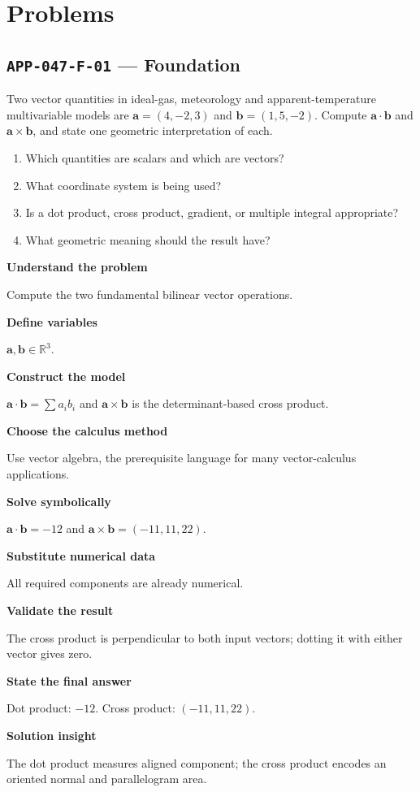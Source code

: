 \documentclass[11pt]{book}
\newcommand{\pid}[1]{\texttt{#1}}
\begin{document}
\section*{Problems}
\subsection*{\pid{APP-047-F-01} — Foundation}
\begin{problembox}
Two vector quantities in ideal-gas, meteorology and apparent-temperature multivariable models are $\mathbf a=(4,-2,3)$ and $\mathbf b=(1,5,-2)$. Compute $\mathbf a\cdot\mathbf b$ and $\mathbf a\times\mathbf b$, and state one geometric interpretation of each.
\end{problembox}
\begin{promptbox}\begin{enumerate}
\item Which quantities are scalars and which are vectors?
\item What coordinate system is being used?
\item Is a dot product, cross product, gradient, or multiple integral appropriate?
\item What geometric meaning should the result have?
\end{enumerate}\end{promptbox}
\begin{solutionbox}
\textbf{Understand the problem}\par Compute the two fundamental bilinear vector operations.\par\medskip
\textbf{Define variables}\par $\mathbf a,\mathbf b\in\mathbb R^3$.\par\medskip
\textbf{Construct the model}\par $\mathbf a\cdot\mathbf b=\sum a_ib_i$ and $\mathbf a\times\mathbf b$ is the determinant-based cross product.\par\medskip
\textbf{Choose the calculus method}\par Use vector algebra, the prerequisite language for many vector-calculus applications.\par\medskip
\textbf{Solve symbolically}\par $\mathbf a\cdot\mathbf b=-12$ and $\mathbf a\times\mathbf b=(-11,11,22)$.\par\medskip
\textbf{Substitute numerical data}\par All required components are already numerical.\par\medskip
\textbf{Validate the result}\par The cross product is perpendicular to both input vectors; dotting it with either vector gives zero.\par\medskip
\textbf{State the final answer}\par Dot product: $-12$. Cross product: $(-11,11,22)$.\par\medskip
\textbf{Solution insight}\par The dot product measures aligned component; the cross product encodes an oriented normal and parallelogram area.\par\medskip
\end{solutionbox}
\end{document}
